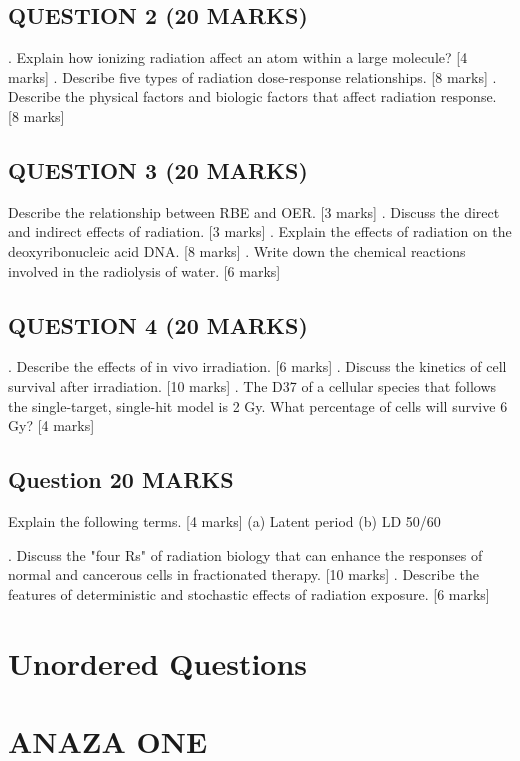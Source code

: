 \documentclass{assignment}
\begin{document}
\begin{problem}
\subsection*{QUESTION 2 (20 MARKS)}
. Explain how ionizing radiation affect an atom within a large molecule? [4 marks]
. Describe five types of radiation dose-response relationships. [8 marks]
. Describe the physical factors and biologic factors that affect radiation response. [8 marks]
\subsection{QUESTION 3 (20 MARKS)}
 Describe the relationship between RBE and OER. [3 marks]
. Discuss the direct and indirect effects of radiation. [3 marks]
. Explain the effects of radiation on the deoxyribonucleic acid DNA. [8 marks]
. Write down the chemical reactions involved in the radiolysis of water. [6 marks]
\subsection{QUESTION 4 (20 MARKS)}
. Describe the effects of in vivo irradiation. [6 marks]
. Discuss the kinetics of cell survival after irradiation. [10 marks]
. The D37 of a cellular species that follows the single-target, single-hit model is 2 Gy. What
percentage of cells will survive 6 Gy? [4 marks]
\subsection{Question 20 MARKS}
 Explain the following terms. [4 marks]
(a) Latent period
(b) LD 50/60

. Discuss the "four Rs" of radiation biology that can enhance the responses of normal and
cancerous cells in fractionated therapy. [10 marks]
. Describe the features of deterministic and stochastic effects of radiation exposure.
[6 marks]
\section{Unordered Questions}
\noindent 
\section{ANAZA ONE }

\end{problem}
\end{document}
